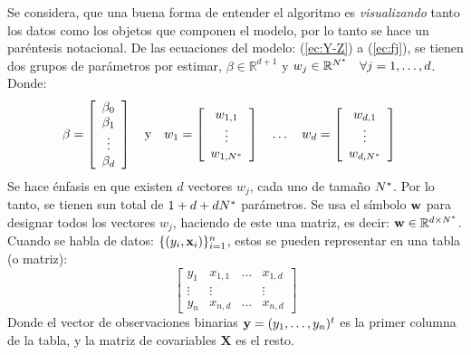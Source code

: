 \documentclass[../Main/Main.tex]{subfiles}
\begin{document}
Se considera, que una buena forma de entender el algoritmo es \textit{visualizando} tanto los datos como los objetos que componen el modelo, por lo tanto se hace un paréntesis notacional. De las ecuaciones del modelo: (\ref{ec:Y-Z}) a (\ref{ec:fj}), se tienen dos grupos de parámetros por estimar, $\beta \in \mathbb{R}^{d+1}$ y $w_j \in \mathbb{R}^{N^*} \quad \forall j = 1,\ldots,d$. Donde:
\begin{align*}
\beta &= 
\left[ 
	\begin{array}{c}
	\beta_0 \\
	\beta_1 \\ 
	\vdots \\
	\beta_d
	\end{array}\right]
\quad \text{y} \quad 
w_1 = 
\left[ 
	\begin{array}{c}
	w_{1,1}\\
	\vdots\\
	w_{1,N^*}
	\end{array}\right]
\quad \ldots \quad 
w_d = 
\left[ 
	\begin{array}{c}
	w_{d,1}\\
	\vdots\\
	w_{d,N^*}
	\end{array}\right]
\end{align*}
Se hace énfasis en que existen $d$ vectores $w_j$, cada uno de tamaño $N^*$. Por lo tanto, se tienen sun total de $1 + d + dN^*$ parámetros. Se usa el símbolo $\mathbf{w}$ para designar todos los vectores $w_j$, haciendo de este una matriz, es decir: $\mathbf{w}\in\mathbb{R}^{d\times N^*}$. Cuando se habla de datos: $\{(y_i,\mathbf{x}_i)\}_{i = 1}^n$, estos se pueden  representar en una tabla (o matriz):
$$\left[\begin{array}{c|ccc} 
y_1 & x_{1,1} & \ldots & x_{1,d} \\ 
\vdots & \vdots & ~ & \vdots \\ 
y_n & x_{n,d} & \ldots & x_{n,d}
\end{array}\right]$$
Donde el vector de observaciones binarias $\mathbf{y} = (y_1,\ldots,y_n)^t$ es la primer columna de la tabla, y la matriz de covariables $\mathbf{X}$ es el resto.\\
\end{document}
